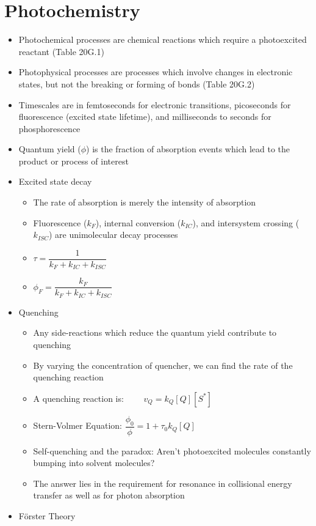 \documentclass[12pt, openany, letterpaper]{memoir}
\begin{document}
\section{Photochemistry}
\begin{itemize}
	\item Photochemical processes are chemical reactions which require a photoexcited reactant (Table 20G.1)
	\item Photophysical processes are processes which involve changes in electronic states, but not the breaking or forming of bonds (Table 20G.2)
	\item Timescales are in femtoseconds for electronic transitions, picoseconds for fluorescence (excited state lifetime), and milliseconds to seconds for phosphorescence
	\item Quantum yield ($\phi$) is the fraction of absorption events which lead to the product or process of interest
	\item Excited state decay
	\begin{itemize}
		\item The rate of absorption is merely the intensity of absorption
		\item Fluorescence ($k_F$), internal conversion ($k_{IC}$), and intersystem crossing ($k_{ISC}$) are unimolecular decay processes
		\item $\tau=\dfrac{1}{k_F+k_{IC}+k_{ISC}}$
		\item $\phi_F=\dfrac{k_F}{k_F+k_{IC}+k_{ISC}}$
	\end{itemize}
	\item Quenching
	\begin{itemize}
		\item Any side-reactions which reduce the quantum yield contribute to quenching
		\item By varying the concentration of quencher, we can find the rate of the quenching reaction
		\item A quenching reaction is:  $\hspace{2em} v_Q=k_Q[Q][S^*]$
		\item Stern-Volmer Equation: $\dfrac{\phi_{0}}{\phi} = 1 + \tau_0k_Q[Q]$		
		\item Self-quenching and the paradox: Aren't photoexcited molecules constantly bumping into solvent molecules?
		\item The answer lies in the requirement for resonance in collisional energy transfer as well as for photon absorption
	\end{itemize}
	\item F\"orster Theory

\end{itemize}
\end{document}
